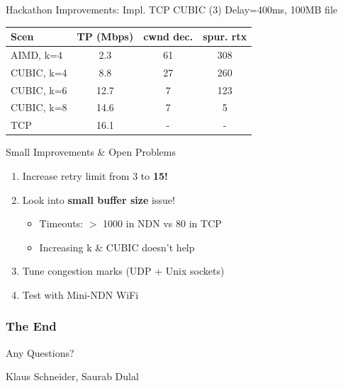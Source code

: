\begin{frame}[fragile]{Hackathon Improvements: Impl. TCP CUBIC (3)}
Delay=400ms, 100MB file

\vspace*{1em}

\begin{tabular}{lccc}
\toprule
\textbf{Scen} & \textbf{TP (Mbps)} & \textbf{cwnd dec.} & \textbf{spur. rtx} \\ 
\midrule
AIMD, k=4 &   2.3 & 61 & 308  \\
CUBIC, k=4 &  8.8 & 27 & 260  \\
CUBIC, k=6 & 12.7 & 7 & 123  \\
CUBIC, k=8 & 14.6 & 7 & 5  \\
TCP 		  &  16.1 & - & -\\

\bottomrule
\end{tabular}

\end{frame}


\begin{frame}[fragile]{Small Improvements \& Open Problems}

\begin{enumerate}
\item Increase retry limit from 3 to \textbf{15!}

\pause
\item Look into \textbf{small buffer size} issue! 
\begin{itemize}
\item Timeouts: $>$ 1000 in NDN vs 80 in TCP
\item Increasing k \& CUBIC doesn't help
\end{itemize}



\pause
\item Tune congestion marks (UDP + Unix sockets)

\pause
\item Test with Mini-NDN WiFi
\end{enumerate}

\end{frame}


\begin{frame}
	\frametitle{The End}
	\vspace{2cm}
	{\huge Any Questions?
	}
	\vspace{2.5cm}  
	\begin{flushright}  
		Klaus Schneider, Saurab Dulal \\ 
	\end{flushright}
\end{frame}




